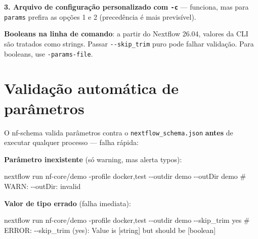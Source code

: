 \documentclass[
  brazilian,
  letterpaper,
  DIV=11,
  numbers=noendperiod]{scrreprt}
\newenvironment{Shaded}{\begin{snugshade}}{\end{snugshade}}
\newcommand{\AttributeTok}[1]{\textcolor[rgb]{0.40,0.45,0.13}{#1}}
\newcommand{\CommentTok}[1]{\textcolor[rgb]{0.37,0.37,0.37}{#1}}
\newcommand{\ExtensionTok}[1]{\textcolor[rgb]{0.00,0.23,0.31}{#1}}
\newcommand{\NormalTok}[1]{\textcolor[rgb]{0.00,0.23,0.31}{#1}}
\begin{document}
\textbf{3. Arquivo de configuração personalizado com \texttt{-c}} ---
funciona, mas para \texttt{params} prefira as opções 1 e 2 (precedência
é mais previsível).

\begin{tcolorbox}[enhanced jigsaw, arc=.35mm, bottomrule=.15mm, bottomtitle=1mm, breakable, colback=white, colbacktitle=quarto-callout-important-color!10!white, colframe=quarto-callout-important-color-frame, coltitle=black, left=2mm, leftrule=.75mm, opacityback=0, opacitybacktitle=0.6, rightrule=.15mm, title=\textcolor{quarto-callout-important-color}{\faExclamation}\hspace{0.5em}{Importante}, titlerule=0mm, toprule=.15mm, toptitle=1mm]

\textbf{Booleans na linha de comando}: a partir do Nextflow 26.04,
valores da CLI são tratados como strings. Passar \texttt{-\/-skip\_trim}
puro pode falhar validação. Para booleans, use \texttt{-params-file}.

\end{tcolorbox}

\section{Validação automática de
parâmetros}\label{validauxe7uxe3o-automuxe1tica-de-paruxe2metros}

O nf-schema valida parâmetros contra o \texttt{nextflow\_schema.json}
\textbf{antes} de executar qualquer processo --- falha rápida:

\textbf{Parâmetro inexistente} (só warning, mas alerta typos):

\begin{Shaded}
\begin{Highlighting}[]
\ExtensionTok{nextflow}\NormalTok{ run nf{-}core/demo }\AttributeTok{{-}profile}\NormalTok{ docker,test }\AttributeTok{{-}{-}outdir}\NormalTok{ demo }\AttributeTok{{-}{-}outDir}\NormalTok{ demo}
\CommentTok{\# WARN: {-}{-}outDir: invalid}
\end{Highlighting}
\end{Shaded}

\textbf{Valor de tipo errado} (falha imediata):

\begin{Shaded}
\begin{Highlighting}[]
\ExtensionTok{nextflow}\NormalTok{ run nf{-}core/demo }\AttributeTok{{-}profile}\NormalTok{ docker,test }\AttributeTok{{-}{-}outdir}\NormalTok{ demo }\AttributeTok{{-}{-}skip\_trim}\NormalTok{ yes}
\CommentTok{\# ERROR: {-}{-}skip\_trim (yes): Value is [string] but should be [boolean]}
\end{Highlighting}
\end{Shaded}
\end{document}

